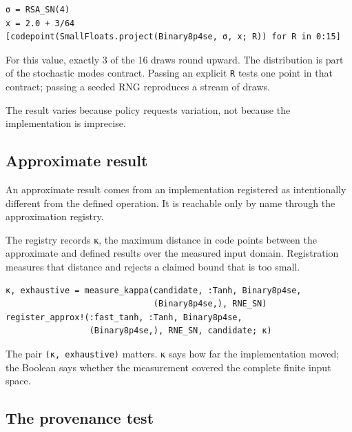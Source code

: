 \begin{verbatim}
σ = RSA_SN(4)
x = 2.0 + 3/64
[codepoint(SmallFloats.project(Binary8p4se, σ, x; R)) for R in 0:15]
\end{verbatim}



For this value, exactly 3 of the 16 draws round upward. The distribution is part of the stochastic mode{\textquotesingle}s contract. Passing an explicit \texttt{R} tests one point in that contract; passing a seeded RNG reproduces a stream of draws.



The result varies because policy requests variation, not because the implementation is imprecise.



\subsection{Approximate result}



\label{689737664477623762}{}


An approximate result comes from an implementation registered as intentionally different from the defined operation. It is reachable only by name through the approximation registry.



The registry records κ, the maximum distance in code points between the approximate and defined results over the measured input domain. Registration measures that distance and rejects a claimed bound that is too small.




\begin{verbatim}
κ, exhaustive = measure_kappa(candidate, :Tanh, Binary8p4se,
                              (Binary8p4se,), RNE_SN)
register_approx!(:fast_tanh, :Tanh, Binary8p4se,
                 (Binary8p4se,), RNE_SN, candidate; κ)
\end{verbatim}



The pair \texttt{(κ, exhaustive)} matters. κ says how far the implementation moved; the Boolean says whether the measurement covered the complete finite input space.



\subsection{The provenance test}



